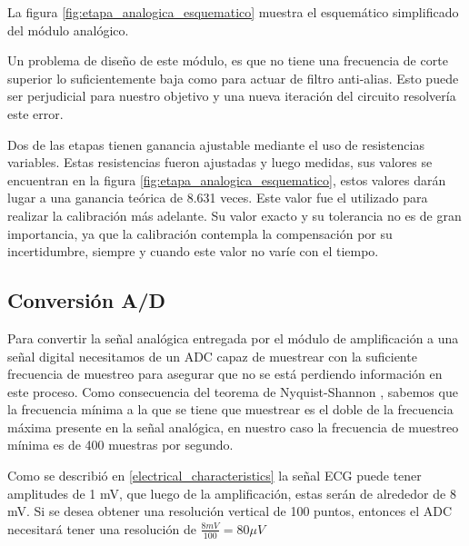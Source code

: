 \documentclass[conference]{IEEEtran}
\begin{document}
La figura \ref{fig:etapa_analogica_esquematico} muestra el esquemático simplificado
del módulo analógico.



Un problema de diseño de este módulo, es que no tiene una frecuencia de corte
superior lo suficientemente baja como para actuar de filtro anti-alias. Esto
puede ser perjudicial para nuestro objetivo y una nueva iteración del circuito
resolvería este error.


Dos de las etapas tienen ganancia ajustable mediante el uso de resistencias
variables. Estas resistencias fueron ajustadas y luego medidas, sus valores se
encuentran en la figura \ref{fig:etapa_analogica_esquematico}, estos valores
darán lugar a una ganancia teórica de 8.631 veces. Este valor fue el utilizado para
realizar la calibración más adelante. Su valor exacto y su tolerancia no es de
gran importancia, ya que la calibración contempla la compensación por su
incertidumbre, siempre y cuando este valor no varíe con el tiempo.


\subsection{Conversión A/D}

Para convertir la señal analógica entregada por el módulo de amplificación a una señal
digital necesitamos de un ADC capaz de muestrear con la suficiente frecuencia de muestreo
para asegurar que no se está perdiendo información en este proceso. Como consecuencia del
teorema de Nyquist-Shannon \cite{shannon_sampling}, sabemos que la frecuencia mínima a la
que se tiene que muestrear es el doble de la frecuencia máxima presente en la señal 
analógica, en nuestro caso la frecuencia de muestreo mínima es de 400 muestras por segundo.

Como se describió en \ref{electrical_characteristics} la señal ECG puede tener amplitudes
de 1 mV, que luego de la amplificación, estas serán de alrededor de 8 mV. Si se desea
obtener una resolución vertical de 100 puntos, entonces el ADC necesitará tener una
resolución de $\frac{8 mV}{100} = 80 \mu V$
\end{document}

